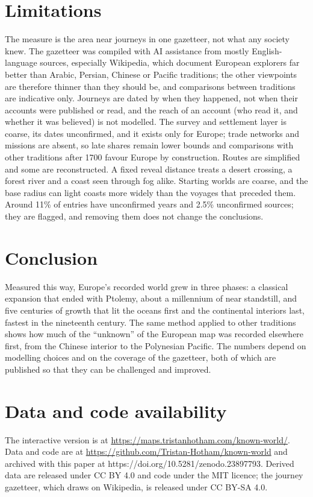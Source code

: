 \documentclass[11pt,a4paper]{article}
\begin{document}
\section{Limitations}
The measure is the area near journeys in one gazetteer, not what any society knew. The gazetteer was compiled with AI assistance from mostly English-language sources, especially Wikipedia, which document European explorers far better than Arabic, Persian, Chinese or Pacific traditions; the other viewpoints are therefore thinner than they should be, and comparisons between traditions are indicative only. Journeys are dated by when they happened, not when their accounts were published or read, and the reach of an account (who read it, and whether it was believed) is not modelled. The survey and settlement layer is coarse, its dates unconfirmed, and it exists only for Europe; trade networks and missions are absent, so late shares remain lower bounds and comparisons with other traditions after 1700 favour Europe by construction. Routes are simplified and some are reconstructed. A fixed reveal distance treats a desert crossing, a forest river and a coast seen through fog alike. Starting worlds are coarse, and the base radius can light coasts more widely than the voyages that preceded them. Around 11\% of entries have unconfirmed years and 2.5\% unconfirmed sources; they are flagged, and removing them does not change the conclusions.

\section{Conclusion}
Measured this way, Europe's recorded world grew in three phases: a classical expansion that ended with Ptolemy, about a millennium of near standstill, and five centuries of growth that lit the oceans first and the continental interiors last, fastest in the nineteenth century. The same method applied to other traditions shows how much of the ``unknown'' of the European map was recorded elsewhere first, from the Chinese interior to the Polynesian Pacific. The numbers depend on modelling choices and on the coverage of the gazetteer, both of which are published so that they can be challenged and improved.

\section*{Data and code availability}
The interactive version is at \url{https://maps.tristanhotham.com/known-world/}. Data and code are at \url{https://github.com/Tristan-Hotham/known-world} and archived with this paper at https://doi.org/10.5281/zenodo.23897793. Derived data are released under CC BY 4.0 and code under the MIT licence; the journey gazetteer, which draws on Wikipedia, is released under CC BY-SA 4.0.
\end{document}
